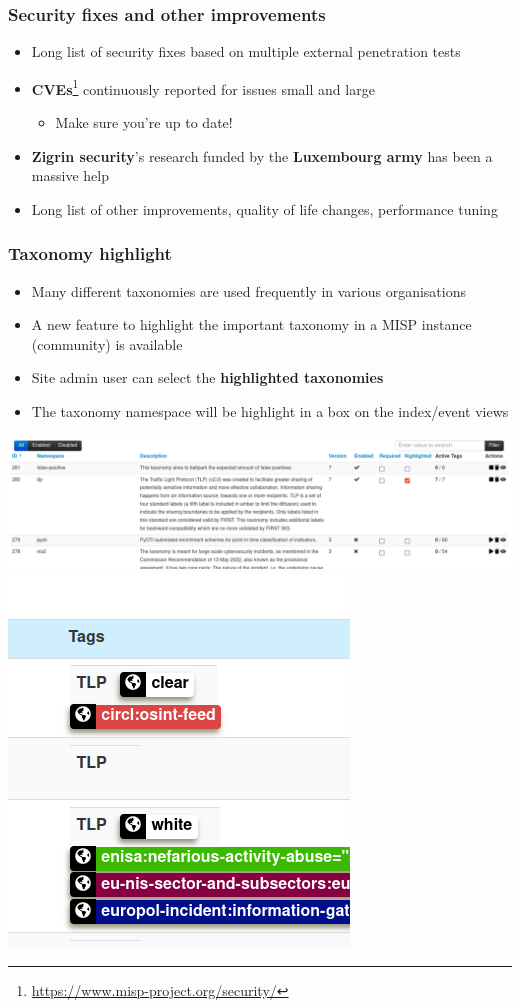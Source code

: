 \begin{frame}
  \frametitle{Security fixes and other improvements}
  \begin{itemize}
     \item Long list of security fixes based on multiple external penetration tests
     \item {\bf CVEs}\footnote{\url{https://www.misp-project.org/security/}} continuously reported for issues small and large
     \begin{itemize}
         \item Make sure you're up to date!
     \end{itemize}
     \item {\bf Zigrin security}'s research funded by the {\bf Luxembourg army} has been a massive help
     \item Long list of other improvements, quality of life changes, performance tuning
  \end{itemize}
\end{frame}

\begin{frame}
\frametitle{Taxonomy highlight}
\begin{itemize}
    \item Many different taxonomies are used frequently in various organisations
    \item A new feature to highlight the important taxonomy in a MISP instance (community) is available
    \item Site admin user can select the {\bf highlighted taxonomies}
    \item The taxonomy namespace will be highlight in a box on the index/event views
\end{itemize}
    \includegraphics[scale=0.2]{./images/highlight.png}
    \includegraphics[scale=0.2]{./images/highlight2.png}
\end{frame}

